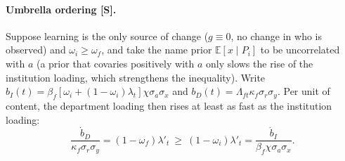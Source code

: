 \paragraph{Umbrella ordering [S].} Suppose learning is the only source of change ($g\equiv0$, no change in who is
observed) and $\omega_i\ge\omega_f$, and take the name prior $\mathbb E[x\mid P_i]$ to be uncorrelated with $a$ (a
prior that covaries positively with $a$ only slows the rise of the institution loading, which strengthens the
inequality). Write $b_I(t)=\beta_f[\omega_i+(1-\omega_i)\lambda_t]\chi\sigma_a\sigma_x$ and
$b_D(t)=\Lambda_{ft}\kappa_f\sigma_r\sigma_y$. Per unit of content, the department loading then rises at least as
fast as the institution loading:
\[
\frac{\dot b_D}{\kappa_f\sigma_r\sigma_y}=(1-\omega_f)\lambda'_t\ \ge\ (1-\omega_i)\lambda'_t=\frac{\dot b_I}{\beta_f\chi\sigma_a\sigma_x} .
\]

